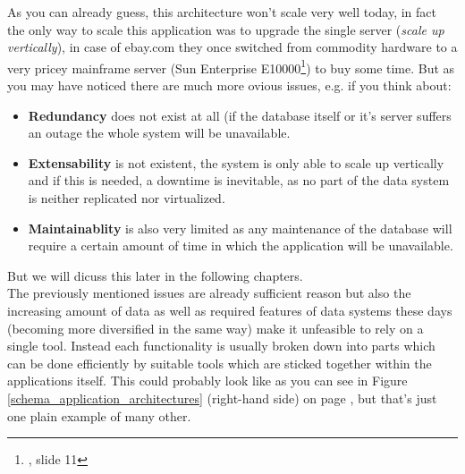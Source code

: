 As you can already guess, this architecture won't scale very well today, in fact the only way to scale this application was to upgrade the single server (\textit{scale up vertically}), in case of ebay.com they once switched from commodity hardware to a very pricey mainframe server (Sun Enterprise E10000\footnote{\cite{EBAYA}, slide 11}) to buy some time. But as you may have noticed there are much more ovious issues, e.g. if you think about:
\begin{itemize}
	\item \textbf{Redundancy} does not exist at all (if the database itself or it's server suffers an outage the whole system will be unavailable.
	\item \textbf{Extensability} is not existent, the system is only able to scale up vertically and if this is needed, a downtime is inevitable, as no part of the data system is neither replicated nor virtualized.
	\item \textbf{Maintainablity} is also very limited as any maintenance of the database will require a certain amount of time in which the application will be unavailable.
\end{itemize}
But we will dicuss this later in the following chapters.\\

The previously mentioned issues are already sufficient reason but also the increasing amount of data as well as required features of data systems these days (becoming more diversified in the same way) make it unfeasible to rely on a single tool. Instead each functionality is usually broken down into parts which can be done efficiently by suitable tools which are sticked together within the applications itself. This could probably look like as you can see in Figure \ref{schema_application_architectures} (right-hand side) on page \pageref{schema_application_architectures}, but that's just one plain example of many other.\\


